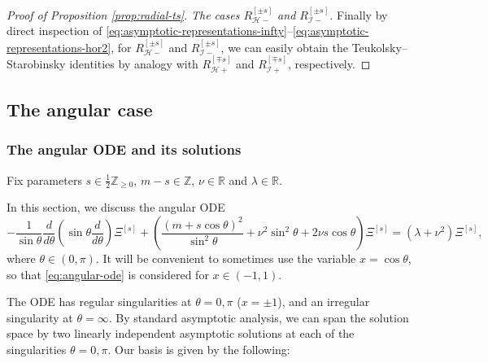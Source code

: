 \documentclass[11pt]{article}
\newcommand{\Z}{\mathbb Z}
\newcommand{\R}{\mathbb R}
\newcommand{\cH}{\mathcal H}
\newcommand{\cI}{\mathcal I}
\numberwithin{equation}{section}
\begin{document}
\begin{proof}[Proof of Proposition \ref{prop:radial-ts}]
\emph{The cases $R^{[\pm s]}_{\cH-}$ and $R^{[\pm s]}_{\cI-}$.} Finally by direct inspection of \eqref{eq:asymptotic-representations-infty}--\eqref{eq:asymptotic-representations-hor2}, for $R^{[\pm s]}_{\cH-}$ and $R^{[\pm s]}_{\cI-}$, we can easily obtain the Teukolsky--Starobinsky identities by analogy with $R^{[\mp s]}_{\cH+}$ and $R^{[\mp s]}_{\cI+}$, respectively.
\end{proof}


\subsection{The angular case}

\subsubsection{The angular ODE and its solutions}

Fix parameters $s\in \frac12\Z_{\geq0}$, $m-s\in\Z$, $\nu\in\R$ and $\lambda\in\R$.

In this section, we discuss the angular ODE
\begin{equation}\label{eq:angular-ode}
-\frac{1}{\sin\theta}\frac{d}{d\theta}\left(\sin\theta\frac{d}{d\theta}\right)\Xi^{[s]}
+\left(\frac{(m+ s\cos\theta)^2}{\sin^2\theta}
+\nu^2\sin^2\theta+2\nu s\cos\theta\right)\Xi^{[s]}
=(\lambda+\nu^2)\Xi^{[s]},
\end{equation}
where $\theta\in(0,\pi)$. It will be convenient to sometimes use the variable $x=\cos\theta$, so that \eqref{eq:angular-ode} is considered for $x\in(-1,1)$.

The ODE has regular singularities at $\theta=0,\pi$ ($x=\pm 1$), and an irregular singularity at $\theta=\infty$. By standard asymptotic analysis, we can span the solution space by two linearly independent asymptotic solutions at each of the singularities $\theta=0,\pi$. Our basis is given by the following:
\end{document}

